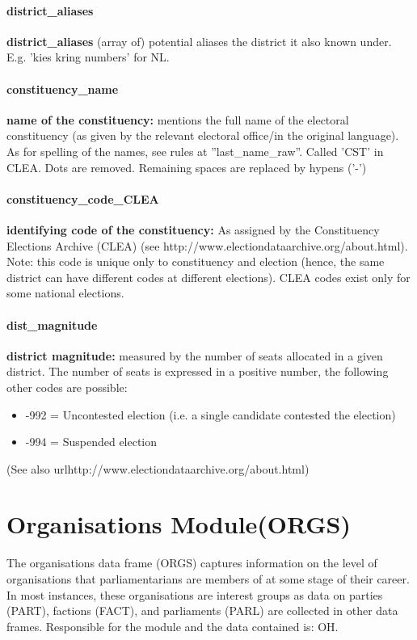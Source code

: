 \documentclass{article}
\begin{document}
\paragraph{district\_aliases}
\textbf{district\_aliases} (array of) potential aliases the district it also known under. E.g. 'kies kring numbers' for NL.

\paragraph{constituency\_name}
\textbf{name of the constituency:} mentions the full name of the electoral constituency (as given by the relevant electoral office/in the original language).  As for spelling of the names, see rules at ”last\_name\_raw”. Called 'CST' in CLEA. Dots are removed. Remaining spaces are replaced by hypens ('-')

\paragraph{constituency\_code\_CLEA}
\textbf{identifying code of the constituency:} As assigned by the Constituency  Elections Archive (CLEA) (see http://www.electiondataarchive.org/about.html). Note: this code is unique only to constituency and election (hence, the same district can have different codes at different elections). CLEA codes exist only for some national elections.

\paragraph{dist\_magnitude}
\textbf{district magnitude:} measured by the number of seats allocated in a given district. The number of seats is expressed in a positive number, the following other codes are possible:
    \begin{itemize}
       \item -992 = Uncontested election (i.e. a single candidate contested the election)
       \item -994 = Suspended election
    \end{itemize}
    (See also url{http://www.electiondataarchive.org/about.html})




\section{Organisations Module(\gls{ORGS})}\label{ORGS}
The organisations data frame (\gls{ORGS}) captures information on the level of organisations that parliamentarians are members of at some stage of their career. In most instances, these organisations are interest groups as data on parties (\gls{PART}), factions (\gls{FACT}), and parliaments (\gls{PARL}) are collected in other data frames. Responsible for the module and the data contained is: OH.
\end{document}

